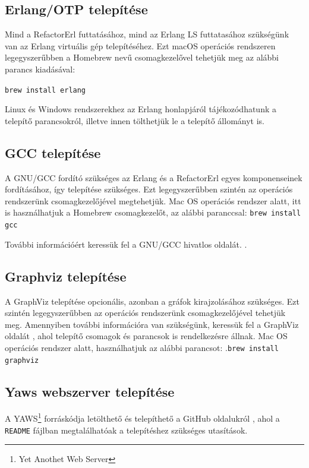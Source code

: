 \subsection{Erlang/OTP telepítése}

Mind a RefactorErl futtatásához, mind az Erlang LS futtatasához szükségünk van az Erlang virtuális gép telepítéséhez. Ezt macOS operációs rendszeren legegyszerűbben a Homebrew \cite{homebrew} nevű csomagkezelővel tehetjük meg az alábbi parancs kiadásával:

\noindent \lstinline{brew install erlang}

Linux és Windows rendszerekhez az Erlang honlapjáról \cite{erlangDownloads} tájékozódhatunk a telepítő parancsokról, illetve innen tölthetjük le a telepítő állományt is.

\subsection{GCC telepítése}
A GNU/GCC fordító szükséges az Erlang és a RefactorErl egyes komponenseinek fordításához, így telepítése szükséges. Ezt legegyszerűbben szintén az operációs rendszerünk csomagkezelőjével megtehetjük. Mac OS operációs rendszer alatt, itt is használhatjuk a Homebrew \cite{homebrew} csomagkezelőt, az alábbi paranccsal:
\noindent \lstinline{brew install gcc}

További információért keressük fel a GNU/GCC hivatlos oldalát. \cite{gnuGcc}.

\subsection{Graphviz telepítése}
A GraphViz telepítése opcionális, azonban a gráfok kirajzolásához szükséges. Ezt szintén legegyszerűbben az operációs rendszerünk csomagkezelőjével tehetjük meg. Amennyiben további információra van szükségünk, keressük fel a GraphViz oldalát \cite{graphviz}, ahol telepítő csomagok és parancsok is rendelkezésre állnak.
Mac OS operációs rendszer alatt, használhatjuk az alábbi parancsot:
.\noindent \lstinline{brew install graphviz}

\subsection{Yaws webszerver telepítése}
A YAWS\footnote{Yet Anothet Web Server} forráskódja letölthető és telepíthető a GitHub oldalukról \cite{yawsGithub}, ahol a \lstinline{README} fájlban megtalálhatóak a telepítéshez szükséges utasítások.

